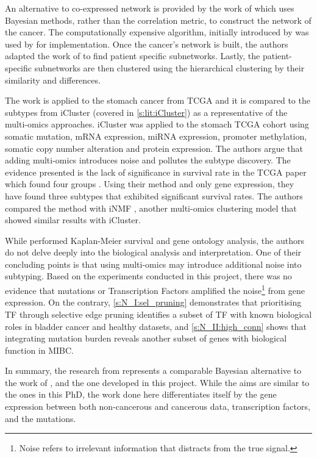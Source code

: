 An alternative to co-expressed network is provided by the work of \citet{Nakazawa2021-yq} which uses Bayesian methods, rather than the correlation metric, to construct the network of the cancer. The computationally expensive algorithm, initially introduced by \citet{Imoto2001-uc} was used by \citet{Tamada2011-ok} for implementation. Once the cancer’s network is built, the authors adapted the work of \citet{Tanaka2020-mw} to find patient specific subnetworks. Lastly, the patient-specific subnetworks are then clustered using the hierarchical clustering by their similarity and differences.

The work is applied to the stomach cancer from TCGA and it is compared to the subtypes from iCluster \citep{Shen2009-ew} (covered in \cref{s:lit:iCluster}) as a representative of the multi-omics approaches. iCluster was applied to the stomach TCGA cohort using somatic mutation, mRNA expression, miRNA expression, promoter methylation, somatic copy number alteration and protein expression. The authors \citet{Nakazawa2021-yq} argue that adding multi-omics introduces noise and pollutes the subtype discovery. The evidence presented is the lack of significance in survival rate in the TCGA paper which found four groups \citep{Cancer_Genome_Atlas_Research_Network2014-xp}. Using their method and only gene expression, they have found three subtypes that exhibited significant survival rates. The authors compared the method with iNMF \citep{Yang2016-dm}, another multi-omics clustering model that showed similar results with iCluster.

While \cite{Nakazawa2021-yq} performed Kaplan-Meier survival and gene ontology analysis, the authors do not delve deeply into the biological analysis and interpretation. One of their concluding points is that using multi-omics may introduce additional noise into subtyping. Based on the experiments conducted in this project, there was no evidence that mutations or Transcription Factors amplified the noise\footnote{Noise refers to irrelevant information that distracts from the true signal.} from gene expression. On the contrary, \cref{s:N_I:sel_pruning} demonstrates that prioritising TF through selective edge pruning identifies a subset of TF with known biological roles in bladder cancer and healthy datasets, and \cref{s:N_II:high_conn} shows that integrating mutation burden reveals another subset of genes with biological function in MIBC.


In summary, the research from \citet{Nakazawa2021-yq} represents a comparable Bayesian alternative to the work of \citet{Care2019-ij}, and the one developed in this project. While the aims are similar to the ones in this PhD, the work done here differentiates itself by the gene expression between both non-cancerous and cancerous data, transcription factors, and the mutations.


